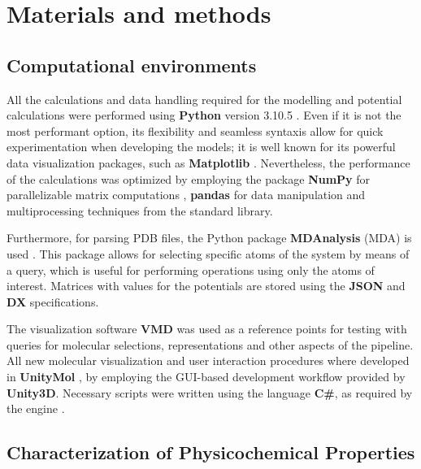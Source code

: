 \chapter{Materials and methods} %

\section{Computational environments}
  All the calculations and data handling required for the modelling and potential calculations were performed using \textbf{Python} version 3.10.5 \cite{python_2009}. Even if it is not the most performant option, its flexibility and seamless syntaxis allow for quick experimentation when developing the models; it is well known for its powerful data visualization packages, such as \textbf{Matplotlib} \cite{python_2021}. Nevertheless, the performance of the calculations was optimized by employing the package \textbf{NumPy} for parallelizable matrix computations \cite{numpy_2020}, \textbf{pandas} for data manipulation \cite{pandas_2020} and multiprocessing techniques from the standard library.

  Furthermore, for parsing PDB files, the Python package \textbf{MDAnalysis} (MDA) is used \cite{mda_2016, mda_2011}. This package allows for selecting specific atoms of the system by means of a query, which is useful for performing operations using only the atoms of interest. Matrices with values for the potentials are stored using the \textbf{JSON} \cite{json_web} and \textbf{DX} \cite{opendx_web} specifications.

  The visualization software \textbf{VMD} \cite{vmd_96} was used as a reference points for testing with queries for molecular selections, representations and other aspects of the pipeline. All new molecular visualization and user interaction procedures where developed in \textbf{UnityMol} \cite{unitymol_web}, by employing the GUI-based development workflow provided by \textbf{Unity3D}. Necessary scripts were written using the language \textbf{C\#}, as required by the engine \cite{unity_2014}.


\section{Characterization of Physicochemical Properties}
